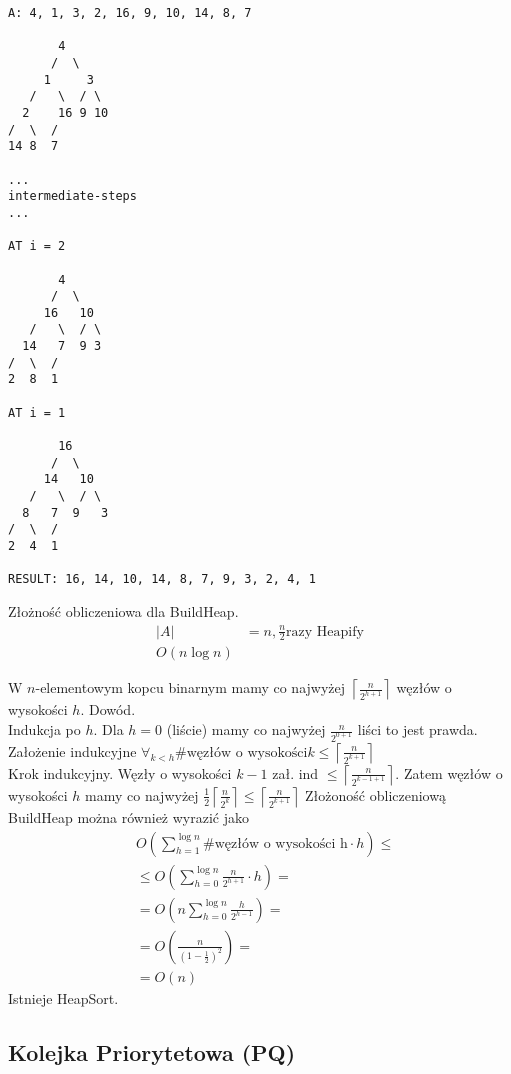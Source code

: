 \documentclass{article}
\numberwithin{equation}{subsection}
\newenvironment{fact}[1]{%
    \trivlist
    \item[\hskip\labelsep\textbf{Fact. #1.}]
    \ignorespaces
}{%
    \endtrivlist
}
\begin{document}
\begin{verbatim}
A: 4, 1, 3, 2, 16, 9, 10, 14, 8, 7

       4
      /  \
     1     3
   /   \  / \
  2    16 9 10
/  \  /
14 8  7

...
intermediate-steps
...

AT i = 2

       4
      /  \
     16   10
   /   \  / \
  14   7  9 3
/  \  /
2  8  1

AT i = 1 

       16
      /  \
     14   10
   /   \  / \
  8   7  9   3
/  \  /
2  4  1

RESULT: 16, 14, 10, 14, 8, 7, 9, 3, 2, 4, 1
\end{verbatim}
Złożność obliczeniowa dla BuildHeap.
\begin{align}
    |A| &= n, \frac{n}{2} \text{razy Heapify}\\
    O(n\log n)
\end{align}

\begin{fact}{Kopiec} W $n$-elementowym kopcu binarnym mamy co najwyżej $\left\lceil \frac{n}{2^{h+1}}\right\rceil$ węzłów o wysokości $h$.
Dowód.\\ Indukcja po $h$. Dla $h=0$ (liście) mamy co najwyżej $\frac{n}{2^{0+1}}$ liści to jest prawda.\\
Założenie indukcyjne $\forall_{k < h} \# \text{węzłów o wysokości} k \leq \left\lceil \frac{n}{2^{k+1}}\right\rceil$\\
Krok indukcyjny. Węzły o wysokości $k-1$ zał. ind $\leq \left\lceil \frac{n}{2^{k-1+1}}\right\rceil$.
Zatem węzłów o wysokości $h$ mamy co najwyżej $\frac{1}{2} \left\lceil \frac{n}{2^{k}}\right\rceil \leq  \left\lceil \frac{n}{2^{k+1}}\right\rceil$
\end{fact}
Złożoność obliczeniową BuildHeap można również wyrazić jako
\begin{align}
    &O\left(\sum_{h=1}^{\log n} \text{\# węzłów o wysokości h} \cdot h\right)\leq\\
    &\leq O\left(\sum_{h=0}^{\log n} \frac{n}{2^{h+1}} \cdot h\right)=\\
    &=O\left(n \sum_{h=0}^{\log n} \frac{h}{2^{h-1}}\right)=\\
    &=O\left(\frac{n}{\left(1-\frac{1}{2}\right)^2}\right)=\\
    &=O\left(n \right)
\end{align}
Istnieje HeapSort.

\subsection{Kolejka Priorytetowa (PQ)}
\end{document}
